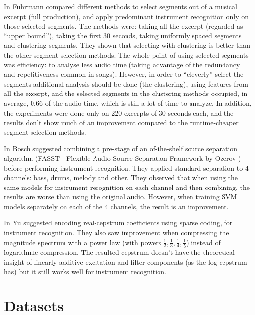 \documentclass[journal]{IEEEtran}
\begin{document}
In \cite{fuhrmann2011quantifying} Fuhrmann \etal compared different methods to select segments out of a musical excerpt (full production), and apply predominant instrument recognition only on those selected segments. The methods were: taking all the excerpt (regarded as ``upper bound''), taking the first 30 seconds, taking uniformly spaced segments and clustering segments. They shown that selecting with clustering is better than the other segment-selection methods. The whole point of using selected segments was efficiency: to analyse less audio time (taking advantage of the redundancy and repetitiveness common in songs). However, in order to ``cleverly'' select the segments additional analysis should be done (the clustering), using features from all the excerpt, and the selected segments in the clustering methods occupied, in average, 0.66 of the audio time, which is still a lot of time to analyze. In addition, the experiments were done only on 220 excerpts of 30 seconds each, and the results don't show much of an improvement compared to the runtime-cheaper segment-selection methods.


In \cite{bosch2012comparison} Bosch \etal suggested combining a pre-stage of an of-the-shelf source separation algorithm (FASST - Flexible Audio Source Separation Framework by Ozerov \etal \cite{ozerov2012general}) before performing instrument recognition. They applied standard separation to 4 channels: bass, drums, melody and other. They observed that when using the same models for instrument recognition on each channel and then combining, the results are worse than using the original audio. However, when training SVM models separately on each of the 4 channels, the result is an improvement.

In \cite{yu2014sparse} Yu \etal suggested encoding real-cepstrum coefficients using sparse coding, for instrument recognition. They also saw improvement when compressing the magnitude spectrum with a power law (with powers $\frac{1}{2},\frac{1}{3},\frac{1}{4},\frac{1}{5}$) instead of logarithmic compression. The resulted cepstrum doesn't have the theoretical insight of linearly additive excitation and filter components (as the log-cepstrum has) but it still works well for instrument recognition.

\section{Datasets}

\ifCLASSOPTIONcaptionsoff
  \newpage
\fi







\end{document}
